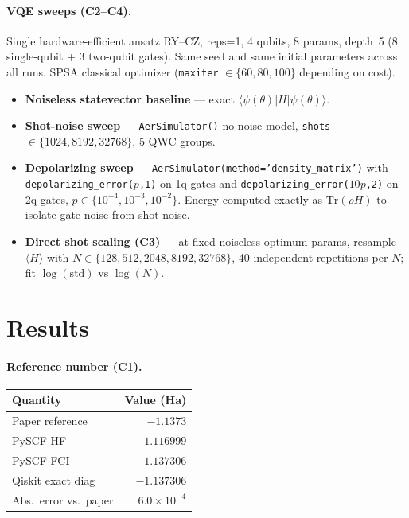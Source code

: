 \documentclass[11pt]{article}
\begin{document}
\paragraph{VQE sweeps (C2--C4).}
Single hardware-efficient ansatz RY--CZ, reps=1, 4 qubits, 8 params, depth~5
(8 single-qubit + 3 two-qubit gates). Same seed and same initial parameters
across all runs. SPSA classical optimizer (\texttt{maxiter} $\in \{60,80,100\}$
depending on cost).
\begin{itemize}
  \item \textbf{Noiseless statevector baseline} --- exact $\langle\psi(\theta)|H|\psi(\theta)\rangle$.
  \item \textbf{Shot-noise sweep} --- \texttt{AerSimulator()} no noise model,
        \texttt{shots} $\in \{1024, 8192, 32768\}$, 5 QWC groups.
  \item \textbf{Depolarizing sweep} ---
        \texttt{AerSimulator(method='density\_matrix')} with
        \texttt{depolarizing\_error($p$,1)} on 1q gates and
        \texttt{depolarizing\_error($10p$,2)} on 2q gates, $p \in \{10^{-4},10^{-3},10^{-2}\}$.
        Energy computed exactly as $\mathrm{Tr}(\rho H)$ to isolate gate noise
        from shot noise.
  \item \textbf{Direct shot scaling (C3)} --- at fixed noiseless-optimum params,
        resample $\langle H \rangle$ with $N \in \{128, 512, 2048, 8192, 32768\}$,
        40 independent repetitions per $N$; fit $\log(\mathrm{std})$ vs $\log(N)$.
\end{itemize}

\section{Results}

\paragraph{Reference number (C1).}
\begin{center}
\begin{tabular}{lr}
\toprule
Quantity & Value (Ha) \\
\midrule
Paper reference & $-1.1373$ \\
PySCF HF & $-1.116999$ \\
PySCF FCI & $-1.137306$ \\
Qiskit exact diag & $-1.137306$ \\
\midrule
Abs.\ error vs.\ paper & $6.0\times10^{-4}$ \\
\bottomrule
\end{tabular}
\end{center}
\end{document}
